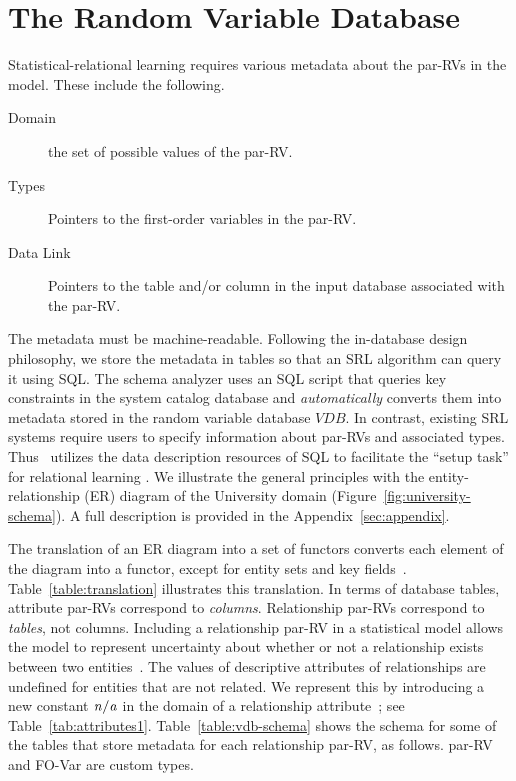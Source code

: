 \section{The Random Variable Database} 

Statistical-relational learning requires various metadata about the par-RVs in the model. These include the following. 

\begin{description}
\item[Domain] the set of possible values of the par-RV.
\item[Types] Pointers to the first-order variables
in the par-RV. 
\item[Data Link] Pointers to the table and/or column in the input database associated with the par-RV. 
\end{description}
%
The metadata must be machine-readable. Following the in-database design philosophy, we store the metadata in tables so that an SRL algorithm can query it using SQL. The schema analyzer uses an SQL script that queries key constraints in the system catalog database and {\em automatically} converts them into metadata stored in the random variable database $VDB$. In contrast, existing SRL systems require users to specify information about par-RVs and associated types. 
Thus \FB\  utilizes the data description resources of SQL to facilitate the ``setup task'' for relational learning \cite{Walker2010}. We illustrate the general principles with the entity-relationship (ER) diagram of the University domain (Figure~\ref{fig:university-schema}). A full description is provided in the Appendix~\ref{sec:appendix}.



The translation of an ER diagram into a set of functors converts each element of the diagram into a functor, except for entity sets and key fields~\cite{Heckerman+al:SRL07}. Table~\ref{table:translation} illustrates this translation. In terms of database tables, attribute par-RVs correspond to {\em columns}. Relationship par-RVs correspond to {\em tables}, not columns. Including a relationship par-RV in a statistical model allows the model to represent uncertainty about whether or not a relationship exists between two entities~\cite{Kimmig2015}. The values of descriptive attributes of relationships are undefined for entities that are not related. We represent this by introducing a new constant $\it{n/a}$ in the domain of a relationship attribute~\cite{Milch2005}; see Table~\ref{tab:attributes1}. Table~\ref{table:vdb-schema} shows the schema for some of the tables that store metadata for 
each relationship par-RV, as follows. par-RV and FO-Var are custom types.

